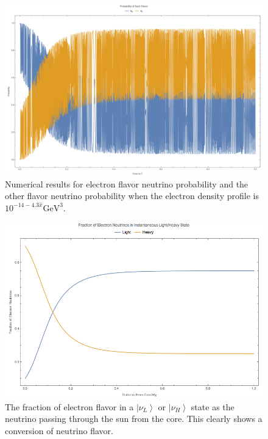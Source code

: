 \documentclass{tufte-handout}
\newcommand{\ket}[1]{\left| #1\right\rangle}
\begin{document}
\begin{figure}
\centering
\includegraphics{assets/numericalMSW-model-3}
\caption{Numerical results for electron flavor neutrino probability and the other flavor neutrino probability when the electron density profile is $10^{-14 - 4.3\hat x} \mathrm{GeV}^{3}$.}
\label{fig:numMSW-model-3}
\end{figure}



\begin{figure}
\centering
\includegraphics{assets/numericalMSW-model-lh.png}
\caption{The fraction of electron flavor in a $\ket{\nu_L}$ or $\ket{\nu_H}$ state as the neutrino passing through the sun from the core. This clearly shows a conversion of neutrino flavor.}
\label{fig:numericalMSW-model-lh}
\end{figure}
\end{document}
